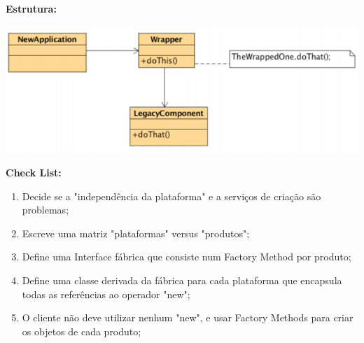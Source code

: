 \documentclass{article}
\begin{document}
\pagebreak

\begin{flushleft}
    \textbf{Estrutura:}

    \begin{center}
        \includegraphics[scale=0.4]{Images/39.png}
    \end{center}

\end{flushleft}

\begin{flushleft}
    \textbf{Check List:}

    \begin{enumerate}
        \item Decide se a "independência da plataforma" e a serviços de criação são problemas;
        \item Escreve uma matriz "plataformas" versus "produtos";
        \item Define uma Interface fábrica que consiste num Factory Method por produto;
        \item Define uma classe derivada da fábrica para cada plataforma que encapsula
        todas as referências ao operador "new";
        \item O cliente não deve utilizar nenhum "new", e usar Factory Methods para criar os objetos de cada produto;
    \end{enumerate}
\end{flushleft}
\end{document}
